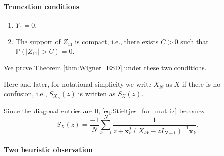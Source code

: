\documentclass[11pt, a4paper]{article}
\numberwithin{equation}{section}
\newcommand{\ie}{i.e.}
\newcommand{\Prob}{\mathbb{P}}
\renewcommand{\vec}[1]{\mathbf{#1}}
\theoremstyle{definition}
\theoremstyle{remark}
\begin{document}
\paragraph{Truncation conditions}

\begin{enumerate}
\item \label{enu:trunc_Wigner_diag}
  $Y_1 = 0$.
\item \label{enu:trunc_Wigner_off_diag}
  The support of $Z_{11}$ is compact, \ie, there exists $C > 0$ such that $\Prob(\lvert Z_{11} \rvert > C) = 0$.
\end{enumerate}
We prove Theorem \ref{thm:Wigner_ESD} under these two conditions.

Here and later, for notational simplicity we write $X_N$ as $X$ if there is no confusion, \ie, $S_{X_N}(z)$ is written as $S_X(z)$.

Since the diagonal entries are $0$, \eqref{eq:Stieltjes_for_matrix} becomes
\begin{equation}
  S_X(z) = \frac{-1}{N} \sum^N_{k = 1} \frac{1}{z + \bar{\vec{x}}^T_k (X_{kk} - z I_{N - 1})^{-1} \vec{x}_k}.
\end{equation}

\paragraph{Two heuristic observation}
\end{document}
